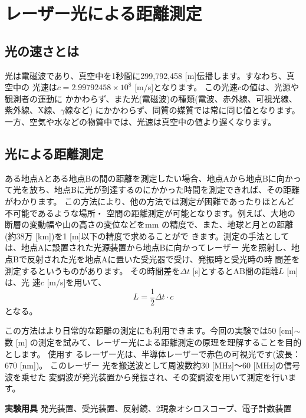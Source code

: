 %
%


\section{レーザー光による距離測定}

\subsection{光の速さとは}

光は電磁波であり、真空中を1秒間に299,792,458 [m]伝播します。すなわち、真空中の 
光速は$c = 2.99792458\times 10^8$ [m/s]となります。
この光速$c$の値は、光源や観測者の運動に 
かかわらず、また光(電磁波)の種類(電波、赤外線、可視光線、紫外線、X線、$\gamma$線など)
にかかわらず、同質の媒質では常に同じ値となります。
一方、空気や水などの物質中では、光速は真空中の値より遅くなります。

\subsection{光による距離測定}

ある地点Aとある地点Bの間の距離を測定したい場合、地点Aから地点Bに向かっ 
て光を放ち、地点Bに光が到達するのにかかった時間を測定できれば、その距離がわかります。 
この方法により、他の方法では測定が困難であったりほとんど不可能であるような場所・
空間の距離測定が可能となります。例えば、大地の断層の変動幅や山の高さの変位などをmm 
の精度で、また、地球と月との距離(約38万 [km])を1 [m]以下の精度で求めることがで 
きます。測定の手法としては、地点Aに設置された光源装置から地点Bに向かってレーザー 
光を照射し、地点Bで反射された光を地点Aに置いた受光器で受け、発振時と受光時の時 
間差を測定するというものがあります。
その時間差を$\Delta t$ [s]とするとAB間の距離$L$ [m]は、光 
速$c$ [m/s]を用いて、
\[
L=\frac{1}{2}\Delta t \cdot c
\]
となる。

この方法はより日常的な距離の測定にも利用できます。今回の実験では50 [cm]$\sim$数 [m] 
の測定を試みて、レーザー光による距離測定の原理を理解することを目的とします。
使用す るレーザー光は、半導体レーザーで赤色の可視光です(波長：670 [nm])。
このレーザー 光を搬送波として周波数約30 [MHz]〜60 [MHz]の信号波を乗せた
変調波が発光装置から発振され、その変調波を用いて測定を行います。






\newpage

\jikken

\begin{itemsquarebox}[c]{\bf 実験用具}
発光装置、受光装置、反射鏡、2現象オシロスコープ、電子計数装置
\end{itemsquarebox}

